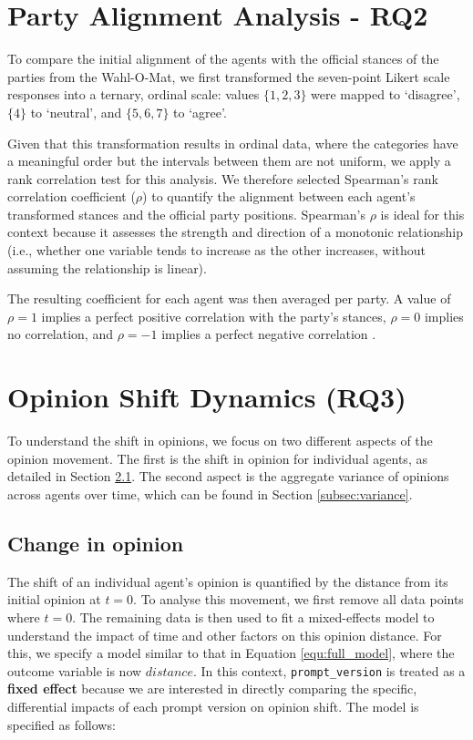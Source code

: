 \section{Party Alignment Analysis - RQ2}

To compare the initial alignment of the agents with the official stances of the parties from the Wahl-O-Mat, we first transformed the seven-point Likert scale responses into a ternary, ordinal scale: values $\{1,2,3\}$ were mapped to `disagree', $\{4\}$ to `neutral', and $\{5,6,7\}$ to `agree'.

Given that this transformation results in ordinal data, where the categories have a meaningful order but the intervals between them are not uniform, we apply a rank correlation test for this analysis. We therefore selected Spearman's rank correlation coefficient ($\rho$) to quantify the alignment between each agent's transformed stances and the official party positions. Spearman's $\rho$ is ideal for this context because it assesses the strength and direction of a monotonic relationship (i.e., whether one variable tends to increase as the other increases, without assuming the relationship is linear).

The resulting coefficient for each agent was then averaged per party. A value of $\rho=1$ implies a perfect positive correlation with the party's stances, $\rho=0$ implies no correlation, and $\rho=-1$ implies a perfect negative correlation \citep{prion2014making}.


\section{Opinion Shift Dynamics (RQ3)}
To understand the shift in opinions, we focus on two different aspects of the opinion movement. The first is the shift in opinion for individual agents, as detailed in Section \ref{subsec:change}. The second aspect is the aggregate variance of opinions across agents over time, which can be found in Section \ref{subsec:variance}.

\subsection{Change in opinion}
\label{subsec:change}

The shift of an individual agent's opinion is quantified by the distance from its initial opinion at $t=0$. To analyse this movement, we first remove all data points where $t=0$. The remaining data is then used to fit a mixed-effects model to understand the impact of time and other factors on this opinion distance. For this, we specify a model similar to that in Equation \ref{equ:full_model}, where the outcome variable is now $distance$. In this context, \texttt{prompt\_version} is treated as a \textbf{fixed effect} because we are interested in directly comparing the specific, differential impacts of each prompt version on opinion shift. The model is specified as follows:


